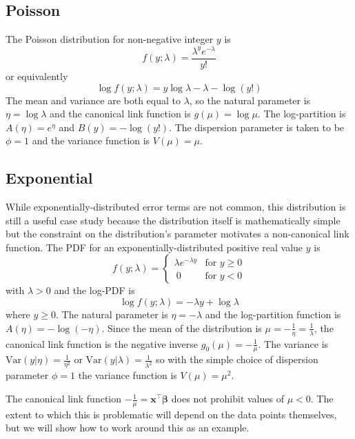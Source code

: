 \documentclass{article}
\newcommand{\bbeta}{\boldsymbol{\beta}}
\begin{document}
\subsection{Poisson}

The Poisson distribution for non-negative integer \(y\) is
\[ f(y; \lambda) = \frac{\lambda^y e^{-\lambda}}{y!} \]
or equivalently
\[ \log f(y; \lambda) = y \log \lambda - \lambda - \log(y!) \]
The mean and variance are both equal to \(\lambda\), so the natural parameter
is \(\eta = \log \lambda\) and the canonical link function is \(g(\mu) = \log
\mu \).
The log-partition is \(A(\eta) = e^\eta \) and \(B(y) = -\log(y!)\).
The dispersion parameter is taken to be \(\phi = 1\) and the variance function
is \(V(\mu) = \mu\).


\subsection{Exponential}

While exponentially-distributed error terms are not common, this distribution is
still a useful case study because the distribution itself is mathematically
simple but the constraint on the distribution's parameter motivates a
non-canonical link function.
The PDF for an exponentially-distributed positive real value \(y\) is
\[ f(y; \lambda) = \begin{cases}
\lambda e^{-\lambda y} & \textrm{for } y \geq 0 \\\
0 & \textrm{for } y < 0
\end{cases}\]
with \(\lambda > 0\) and the log-PDF is
\[ \log f(y; \lambda) = -\lambda y + \log \lambda \]
where \(y \geq 0\). The natural parameter is \(\eta = -\lambda\) and the
log-partition function is \(A(\eta) = - \log(-\eta)\).
Since the mean of the distribution is \(\mu = -\frac{1}{\eta} =
\frac{1}{\lambda}\), the canonical link function is the negative inverse
\(g_0(\mu) = -\frac{1}{\mu}\).
The variance is \(\textrm{Var}(y|\eta) = \frac{1}{\eta^2} \) or
\(\textrm{Var}(y|\lambda) = \frac{1}{\lambda^2} \) so with the simple choice
of dispersion parameter \(\phi = 1\) the variance function is \(V(\mu) =
\mu^2\).

The canonical link function \(-\frac{1}{\mu} = \mathbf{x}^\intercal
\bbeta\) does not prohibit values of \(\mu < 0\). The extent to
which this is problematic will depend on the data points themselves, but we will
show how to work around this as an example.
\end{document}
